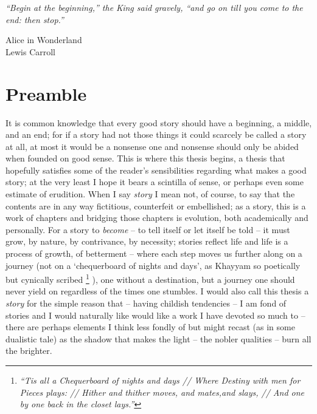 \epigraph{
    \emph{
        ``Begin at the beginning,'' the King said gravely, ``and go on till you come to the end:
        then stop.''
} 
%
}
{Alice in Wonderland\\Lewis Carroll}
%
\section{Preamble}
\noindent It is common knowledge that every good story should have a beginning, a middle, and an
end; for if a story had not those things it could scarcely be called a story at all, at most it
would be a nonsense one and nonsense should only be abided when founded on good sense.
%
This is where this thesis begins, a thesis that hopefully satisfies some of the reader's
sensibilities regarding what makes a good story; at the very least I hope it bears a scintilla of
sense, or perhaps even some estimate of erudition.
%
When I say \emph{story} I mean not, of course, to say that the contents are in any way
fictitious, counterfeit or embellished; as a story, this is a work of chapters and
bridging those chapters is evolution, both academically and personally.
%
For a story to \emph{become} -- to tell itself or let itself be told -- it must grow, by nature, by
contrivance, by necessity; stories reflect life and life is a process of growth, of betterment --
where each step moves us further along on a journey (not on a `chequerboard of nights and days', as
Khayyam so poetically but cynically scribed
%
\footnote{
    \emph{
        “Tis all a Chequerboard of nights and days //
        Where Destiny with men for Pieces plays: //
        Hither and thither moves, and mates,and slays, //
        And one by one back in the closet lays.”
    }
}
%
), one without a destination, but a journey one should
never yield on regardless of the times one stumbles.
%
I would also call this thesis a \emph{story} for the simple reason that -- having childish
tendencies -- I am fond of stories and I would naturally like would like a work I have devoted so
much to -- there are perhaps elements I think less fondly of but might recast (as in some dualistic
tale) as the shadow that makes the light -- the nobler qualities -- burn all the brighter.

%
